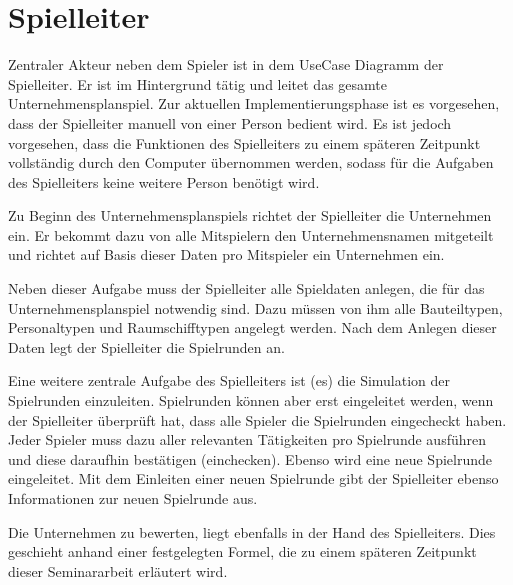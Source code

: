 \section{Spielleiter}
\label{sec:fachkonzept-usecase-spielleiter}

Zentraler Akteur neben dem Spieler ist in dem UseCase Diagramm der Spielleiter. Er ist im Hintergrund tätig und leitet das gesamte Unternehmensplanspiel. Zur aktuellen Implementierungsphase ist es vorgesehen, dass der Spielleiter manuell von einer Person bedient wird. Es ist jedoch vorgesehen, dass die Funktionen des Spielleiters zu einem späteren Zeitpunkt vollständig durch den Computer übernommen werden, sodass für die Aufgaben des Spielleiters keine weitere Person benötigt wird.
 
Zu Beginn des Unternehmensplanspiels richtet der Spielleiter die Unternehmen ein. Er bekommt dazu von alle Mitspielern den Unternehmensnamen mitgeteilt und richtet auf Basis dieser Daten pro Mitspieler ein Unternehmen ein.
 
Neben dieser Aufgabe muss der Spielleiter alle Spieldaten anlegen, die für das Unternehmensplanspiel notwendig sind. Dazu müssen von ihm alle Bauteiltypen, Personaltypen und Raumschifftypen angelegt werden. Nach dem Anlegen dieser Daten legt der Spielleiter die Spielrunden an.
 
Eine weitere zentrale Aufgabe des Spielleiters ist (es) die Simulation der Spielrunden einzuleiten. Spielrunden können aber erst eingeleitet werden, wenn der Spielleiter überprüft hat, dass alle Spieler die Spielrunden eingecheckt haben. Jeder Spieler muss dazu aller relevanten Tätigkeiten pro Spielrunde ausführen und diese daraufhin bestätigen (einchecken). Ebenso wird eine neue Spielrunde eingeleitet.  Mit dem Einleiten einer neuen Spielrunde gibt der Spielleiter ebenso Informationen zur neuen Spielrunde aus.
 
Die Unternehmen zu bewerten, liegt ebenfalls in der Hand des Spielleiters. Dies geschieht anhand einer festgelegten Formel, die zu einem späteren Zeitpunkt dieser Seminararbeit erläutert wird.

\autorende{} 